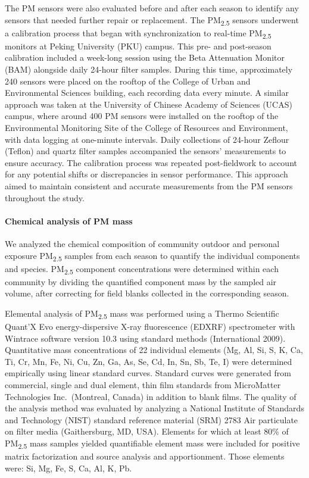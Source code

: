 \documentclass[
  letterpaper,
  DIV=11,
  numbers=noendperiod]{scrartcl}
\let\oldparagraph\paragraph
\renewcommand{\paragraph}[1]{\oldparagraph{#1}\mbox{}}
\begin{document}
The PM sensors were also evaluated before and after each season to
identify any sensors that needed further repair or replacement. The
PM\textsubscript{2.5} sensors underwent a calibration process that began
with synchronization to real-time PM\textsubscript{2.5} monitors at
Peking University (PKU) campus. This pre- and post-season calibration
included a week-long session using the Beta Attenuation Monitor (BAM)
alongside daily 24-hour filter samples. During this time, approximately
240 sensors were placed on the rooftop of the College of Urban and
Environmental Sciences building, each recording data every minute. A
similar approach was taken at the University of Chinese Academy of
Sciences (UCAS) campus, where around 400 PM sensors were installed on
the rooftop of the Environmental Monitoring Site of the College of
Resources and Environment, with data logging at one-minute intervals.
Daily collections of 24-hour Zeflour (Teflon) and quartz filter samples
accompanied the sensors' measurements to ensure accuracy. The
calibration process was repeated post-fieldwork to account for any
potential shifts or discrepancies in sensor performance. This approach
aimed to maintain consistent and accurate measurements from the PM
sensors throughout the study.

\hypertarget{chemical-analysis-of-pm-mass}{%
\paragraph{Chemical analysis of PM
mass}\label{chemical-analysis-of-pm-mass}}

We analyzed the chemical composition of community outdoor and personal
exposure PM\textsubscript{2.5} samples from each season to quantify the
individual components and species. PM\textsubscript{2.5} component
concentrations were determined within each community by dividing the
quantified component mass by the sampled air volume, after correcting
for field blanks collected in the corresponding season.

Elemental analysis of PM\textsubscript{2.5} mass was performed using a
Thermo Scientific Quant'X Evo energy-dispersive X-ray fluorescence
(EDXRF) spectrometer with Wintrace software version 10.3 using standard
methods (International 2009). Quantitative mass concentrations of 22
individual elements (Mg, Al, Si, S, K, Ca, Ti, Cr, Mn, Fe, Ni, Cu, Zn,
Ga, As, Se, Cd, In, Sn, Sb, Te, I) were determined empirically using
linear standard curves. Standard curves were generated from commercial,
single and dual element, thin film standards from MicroMatter
Technologies Inc.~(Montreal, Canada) in addition to blank films. The
quality of the analysis method was evaluated by analyzing a National
Institute of Standards and Technology (NIST) standard reference material
(SRM) 2783 Air particulate on filter media (Gaithersburg, MD, USA).
Elements for which at least 80\% of PM\textsubscript{2.5} mass samples
yielded quantifiable element mass were included for positive matrix
factorization and source analysis and apportionment. Those elements
were: Si, Mg, Fe, S, Ca, Al, K, Pb.
\end{document}
